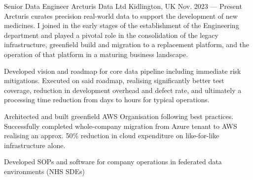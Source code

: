 
\begin{cventries}


  \cventry
    {Senior Data Engineer}
    {Arcturis Data Ltd}
    {Kidlington, UK}
    {Nov. 2023 --- Present}
    Arcturis curates precision real-world data to support the development of new medicines. I joined in the
    early stages of the establishment of the Engineering department and played a pivotal role in the
    consolidation of the legacy infrastructure, greenfield build and migration to a replacement platform, and
    the operation of that platform in a maturing business landscape.
    {
      \begin{cvitems}
        \item{
          Developed vision and roadmap for core data pipeline including immediate risk mitigations.
          Executed on said roadmap, realising significantly better test coverage, reduction in development
          overhead and defect rate, and ultimately a processing time reduction from days to hours for typical
          operations.
        }
        \item{
          Architected and built greenfield AWS Organisation following best practices. Successfully completed
          whole-company migration from Azure tenant to AWS realising an approx. 50\% reduction in cloud
          expenditure on like-for-like infrastructure alone.
        }
        \item{
          Developed SOPs and software for company operations in federated data environments (NHS SDEs)
}
\end{cvitems}}
\end{cventries}

